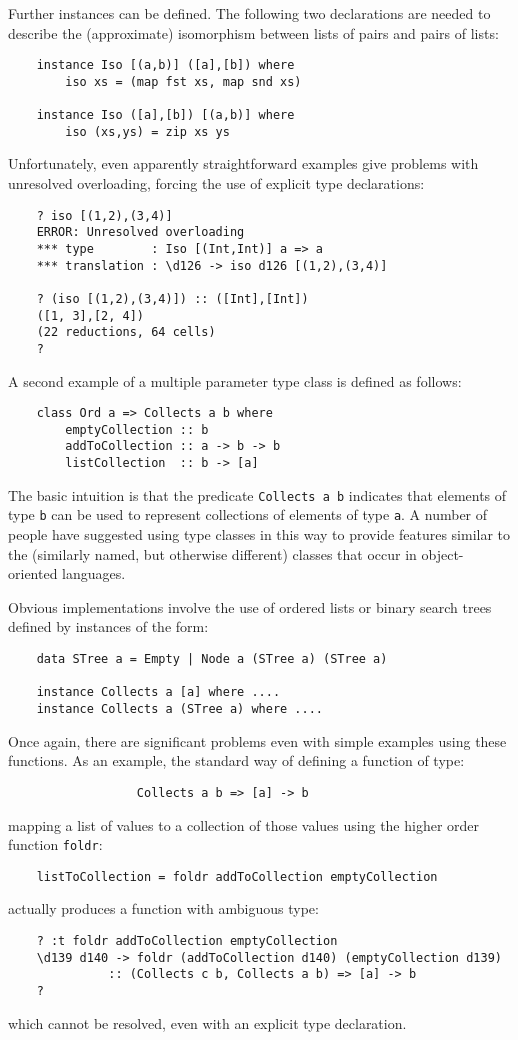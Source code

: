 Further instances can be defined.  The following two  declarations  are
needed to describe the (approximate) isomorphism between lists of pairs
and pairs of lists:
\begin{verbatim}
    instance Iso [(a,b)] ([a],[b]) where  
        iso xs = (map fst xs, map snd xs)
 
    instance Iso ([a],[b]) [(a,b)] where
        iso (xs,ys) = zip xs ys
\end{verbatim}
Unfortunately, even apparently straightforward examples  give  problems
with  unresolved  overloading,  forcing  the  use  of   explicit   type
declarations:
\begin{verbatim}
    ? iso [(1,2),(3,4)]
    ERROR: Unresolved overloading
    *** type        : Iso [(Int,Int)] a => a
    *** translation : \d126 -> iso d126 [(1,2),(3,4)]

    ? (iso [(1,2),(3,4)]) :: ([Int],[Int])
    ([1, 3],[2, 4])
    (22 reductions, 64 cells)
    ?
\end{verbatim}
A second example of a multiple  parameter  type  class  is  defined  as
follows:
\begin{verbatim}
    class Ord a => Collects a b where
        emptyCollection :: b
        addToCollection :: a -> b -> b
        listCollection  :: b -> [a]
\end{verbatim}
The basic intuition is that the predicate \verb"Collects a b"  indicates  that
elements of type \verb"b" can be used to represent collections of elements  of
type \verb"a".  A number of people have suggested using type classes  in  this
way to provide features similar to the (similarly named, but  otherwise
different) classes that occur in object-oriented languages.

Obvious implementations involve the use  of  ordered  lists  or  binary
search trees defined by instances of the form:
\begin{verbatim}
    data STree a = Empty | Node a (STree a) (STree a)
 
    instance Collects a [a] where ....
    instance Collects a (STree a) where ....
\end{verbatim}
Once again, there are significant problems even  with  simple  examples
using these functions.  As an example, the standard way of  defining  a
function of type:
\begin{verbatim}
                  Collects a b => [a] -> b
\end{verbatim}
mapping a list of values to a collection  of  those  values  using  the
higher order function \verb"foldr":
\begin{verbatim}
    listToCollection = foldr addToCollection emptyCollection
\end{verbatim}
actually produces a function with ambiguous type:
\begin{verbatim}
    ? :t foldr addToCollection emptyCollection
    \d139 d140 -> foldr (addToCollection d140) (emptyCollection d139)
              :: (Collects c b, Collects a b) => [a] -> b
    ?
\end{verbatim}
which cannot be resolved, even with an explicit type declaration.

